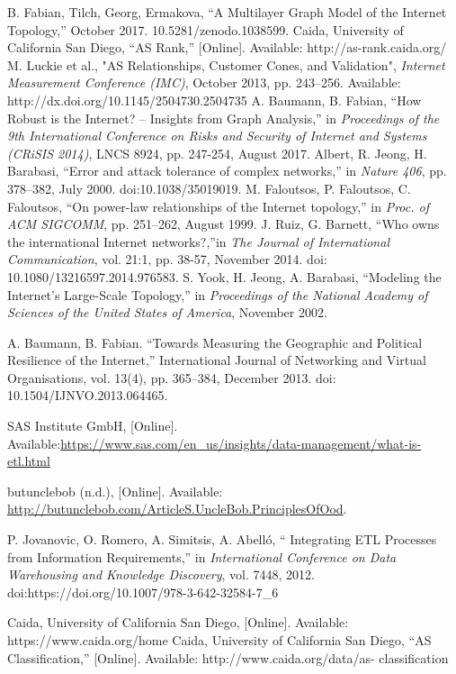 \documentclass[conference, 11pt]{IEEEtran}
\begin{document}
\begin{thebibliography}{00}
B. Fabian, Tilch, Georg, Ermakova, ``A Multilayer Graph Model of the Internet Topology,'' October 2017. 10.5281/zenodo.1038599. %
Caida, University of California San Diego, ``AS Rank,'' [Online].  Available: http://as-rank.caida.org/ %
M. Luckie et al., "AS Relationships, Customer Cones, and Validation", \textit{Internet Measurement Conference (IMC)}, October 2013, pp. 243--256. Available: http://dx.doi.org/10.1145/2504730.2504735 %
A. Baumann, B. Fabian, “How Robust is the Internet? – Insights
from Graph Analysis,” in \textit{Proceedings of the 9th International
Conference on Risks and Security of Internet and Systems (CRiSIS
2014)}, LNCS 8924, pp. 247-254, August 2017. %
Albert, R. Jeong, H. Barabasi, ``Error and attack tolerance of complex networks,'' in \textit{Nature 406}, pp. 378–382, July 2000. doi:10.1038/35019019. %
M. Faloutsos, P. Faloutsos, C. Faloutsos, “On power-law relationships of the Internet topology,”  in \textit{Proc. of ACM SIGCOMM}, pp. 251–262, August 1999. %
J. Ruiz, G. Barnett, ``Who owns the international Internet networks?,''in \textit{The Journal of International
Communication}, vol. 21:1, pp. 38-57, November 2014. doi:
10.1080/13216597.2014.976583. %
S. Yook, H. Jeong, A. Barabasi, ``Modeling the Internet's Large-Scale Topology,'' in \textit{Proceedings of the National Academy of Sciences of the United States of America}, November 2002.

A. Baumann, B. Fabian. ``Towards Measuring the Geographic and Political Resilience of the Internet,'' International Journal of Networking and Virtual Organisations, vol. 13(4), pp. 365–384, December 2013. doi: 10.1504/IJNVO.2013.064465. %

SAS Institute GmbH, [Online]. Available:\url{https://www.sas.com/en_us/insights/data-management/what-is-etl.html} %

 butunclebob (n.d.), [Online]. Available: \url{http://butunclebob.com/ArticleS.UncleBob.PrinciplesOfOod}. %

P. Jovanovic, O. Romero, A. Simitsis, A. Abelló, `` Integrating ETL Processes from Information Requirements,'' in \textit{International Conference on Data Warehousing and Knowledge Discovery}, vol. 7448, 2012. doi:https://doi.org/10.1007/978-3-642-32584-7\_6

Caida, University of California San Diego, [Online]. Available: https://www.caida.org/home %
Caida, University of California San Diego, ``AS Classification,'' [Online]. Available: http://www.caida.org/data/as-
classification %


\end{thebibliography}
\end{document}
